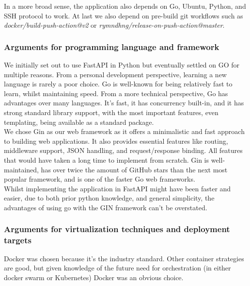 In a more broad sense, the application also depends on Go, Ubuntu, Python, and SSH protocol to work. At last we 
also depend on pre-build git workflows such as \textit{docker/build-push-action@v2} or \textit{rymndhng/release-on-push-action@master}.

\subsubsection{Arguments for programming language and framework}
We initially set out to use FastAPI in Python but eventually settled on GO for multiple reasons. From a personal 
development perspective, learning a new language is rarely a poor choice. Go is well-known for being relatively 
fast to learn, whilst maintaining speed. From a more technical perspective, Go has advantages over many languages. 
It's fast, it has concurrency built-in, and it has strong standard library support, with the most important features, 
even templating, being available as a standard package.\\

We chose Gin as our web framework as it offers a minimalistic and fast approach to building web applications. 
It also provides essential features like routing, middleware support, JSON handling, and request/response binding. All features that would have taken a long time to implement from scratch. Gin is well-maintained, has over twice the 
amount of GitHub stars than the next most popular framework, and is one of the faster Go web frameworks.\\

Whilst implementing the application in FastAPI might have been faster and easier, due to both prior python 
knowledge, and general simplicity, the advantages of using go with the GIN framework can't be overstated.  

\subsubsection{Arguments for virtualization techniques and deployment targets}
Docker was chosen because it's the industry standard. Other container strategies are good, but given knowledge 
of the future need for orchestration (in either docker swarm or Kubernetes) Docker was an obvious choice.\\

